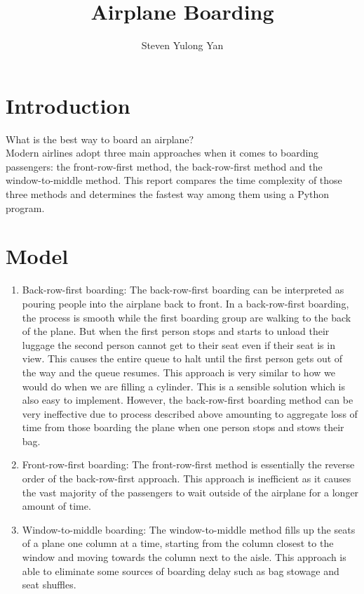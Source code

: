 \documentclass[12pt]{article}
\title{Airplane Boarding}
\author{Steven Yulong Yan}
\begin{document}
\date{}

\maketitle

\tableofcontents

\newpage

\section{Introduction}
What is the best way to board an airplane? 
\\[0.1in]
Modern airlines adopt three main approaches when it comes to boarding passengers:
the front-row-first method, the back-row-first method and the window-to-middle method.
This report compares the time complexity of those three methods and determines the fastest
way among them using a Python program.

\section{Model}

\begin{enumerate}
    \item Back-row-first boarding: The back-row-first boarding can be interpreted as
    pouring people into the airplane back to front. In a back-row-first boarding,
    the process is smooth while the first boarding group are walking to the back of the plane.
    But when the first person stops and starts to unload their luggage the second person
    cannot get to their seat even if their seat is in view. This causes the entire
    queue to halt until the first person gets out of the way and the queue resumes.
    This approach is very similar to how we would do when we are filling a cylinder.
    This is a sensible solution which is also easy to implement. However,
    the back-row-first boarding method can be very ineffective due to process described above amounting to aggregate
    loss of time from those boarding the plane when one person stops and stows their bag.
    \item Front-row-first boarding: The front-row-first method is essentially the reverse order of the
    back-row-first approach. This approach is inefficient as it causes the vast majority of the passengers to wait
    outside of the airplane for a longer amount of time.
    \item Window-to-middle boarding: The window-to-middle method fills up the seats of
    a plane one column at a time, starting from the column closest to the window and
    moving towards the column next to the aisle. This approach is able to eliminate
    some sources of boarding delay such as bag stowage and seat shuffles.
\end{enumerate}
\end{document}
